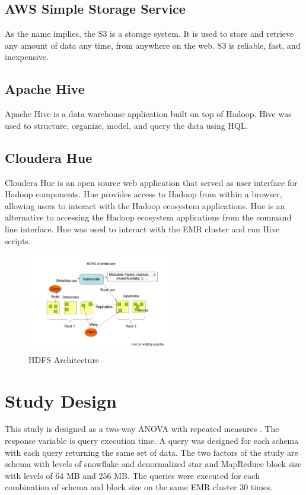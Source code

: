 \documentclass[journal]{IEEEtran}
\begin{document}
\subsection{AWS Simple Storage Service}

As the name implies, the S3 is a storage system.
It is used to store and retrieve any amount of data any time, from anywhere on the web. 
S3 is reliable, fast, and inexpensive.

\subsection{Apache Hive}

Apache Hive is a data warehouse application built on top of Hadoop. 
Hive was used to structure, organize, model, and query the data using HQL.

\subsection{Cloudera Hue}

Cloudera Hue is an open source web application that served as user interface for Hadoop components.
Hue provides access to Hadoop from within a browser, allowing users to interact with the Hadoop ecosystem applications. 
Hue is an alternative to accessing the Hadoop ecosystem applications from the command line interface.
Hue was used to interact with the EMR cluster and run Hive scripts.

\begin{figure}
    \centering
    \includegraphics[width=2.5in]{HDFS_Arch.png}
    \caption{HDFS Architecture}
    \label{HDFS}
\end{figure}

\section{Study Design}

This study is designed as a two-way ANOVA with repeated measures \cite{Sleuth}.
The response variable is query execution time.
A query was designed for each schema with each query returning the same set of data.
The two factors of the study are schema with levels of snowflake and denormalized star and
 MapReduce block size with levels of 64 MB and 256 MB.
The queries were executed for each combination of schema and block size
 on the same EMR cluster 30 times.
\end{document}

